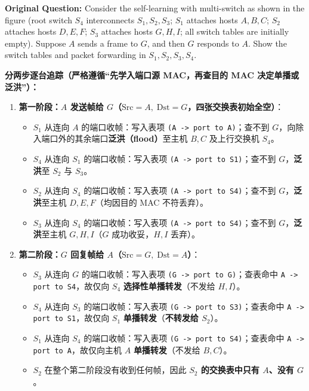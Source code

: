 \textbf{Original Question:} Consider the self-learning with multi-switch as shown in the figure (root switch $S_4$ interconnects $S_1, S_2, S_3$; $S_1$ attaches hosts $A, B, C$; $S_2$ attaches hosts $D, E, F$; $S_3$ attaches hosts $G, H, I$; all switch tables are initially empty). Suppose $A$ sends a frame to $G$, and then $G$ responds to $A$. Show the switch tables and packet forwarding in $S_1, S_2, S_3, S_4$.


\textbf{分两步逐台追踪（严格遵循“先学入端口源 MAC，再查目的 MAC 决定单播或泛洪”）：}
\begin{enumerate}
\item \textbf{第一阶段：$A$ 发送帧给 $G$（$\mathrm{Src}=A,\; \mathrm{Dst}=G$，四张交换表初始全空）}：
  \begin{itemize}
  \item \textbf{$S_1$} 从连向 $A$ 的端口收帧：写入表项 \texttt{(A -> port to A)}；查不到 $G$，向除入端口外的其余端口\textbf{泛洪（flood）}至主机 $B, C$ 及上行交换机 $S_4$。
  \item \textbf{$S_4$} 从连向 $S_1$ 的端口收帧：写入表项 \texttt{(A -> port to S1)}；查不到 $G$，\textbf{泛洪}至 $S_2$ 与 $S_3$。
  \item \textbf{$S_2$} 从连向 $S_4$ 的端口收帧：写入表项 \texttt{(A -> port to S4)}；查不到 $G$，\textbf{泛洪}至主机 $D, E, F$（均因目的 MAC 不符丢弃）。
  \item \textbf{$S_3$} 从连向 $S_4$ 的端口收帧：写入表项 \texttt{(A -> port to S4)}；查不到 $G$，\textbf{泛洪}至主机 $G, H, I$（$G$ 成功收妥，$H, I$ 丢弃）。
  \end{itemize}
\item \textbf{第二阶段：$G$ 回复帧给 $A$（$\mathrm{Src}=G,\; \mathrm{Dst}=A$）}：
  \begin{itemize}
  \item \textbf{$S_3$} 从连向 $G$ 的端口收帧：写入表项 \texttt{(G -> port to G)}；查表命中 \texttt{A -> port to S4}，故仅向 $S_4$ \textbf{选择性单播转发}（不发给 $H, I$）。
  \item \textbf{$S_4$} 从连向 $S_3$ 的端口收帧：写入表项 \texttt{(G -> port to S3)}；查表命中 \texttt{A -> port to S1}，故仅向 $S_1$ \textbf{单播转发}（\textbf{不转发给 $S_2$}）。
  \item \textbf{$S_1$} 从连向 $S_4$ 的端口收帧：写入表项 \texttt{(G -> port to S4)}；查表命中 \texttt{A -> port to A}，故仅向主机 $A$ \textbf{单播转发}（不发给 $B, C$）。
  \item \textbf{$S_2$} 在整个第二阶段没有收到任何帧，因此 \textbf{$S_2$ 的交换表中只有 $A$、没有 $G$}。
  \end{itemize}
\end{enumerate}

